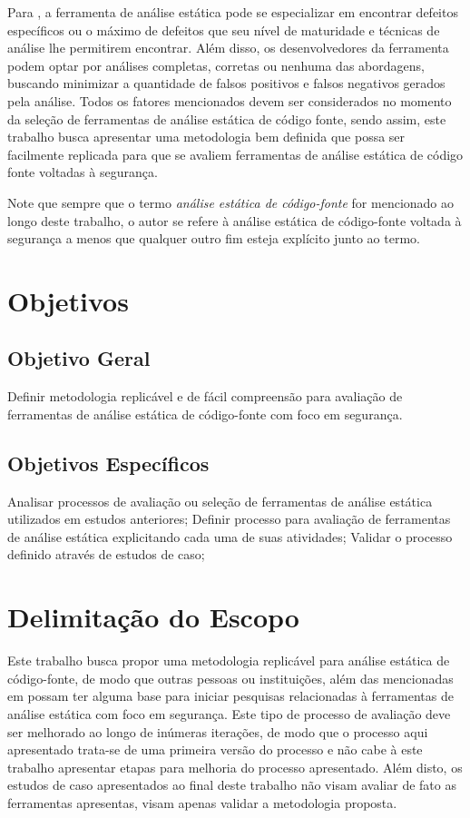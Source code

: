 Para \cite{secure_programming}, a ferramenta de análise estática pode se especializar em encontrar defeitos específicos ou o máximo de defeitos que seu nível de maturidade e técnicas de análise lhe permitirem encontrar. Além disso, os desenvolvedores da ferramenta podem optar por análises completas, corretas ou nenhuma das abordagens, buscando minimizar a quantidade de falsos positivos e falsos negativos gerados pela análise. Todos os fatores mencionados devem ser considerados no momento da seleção de ferramentas de análise estática de código fonte, sendo assim, este trabalho busca apresentar uma metodologia bem definida que possa ser facilmente replicada para que se avaliem ferramentas de análise estática de código fonte voltadas à segurança.

Note que sempre que o termo \textit{análise estática de código-fonte} for mencionado ao longo deste trabalho, o autor se refere à análise estática de código-fonte voltada à segurança a menos que qualquer outro fim esteja explícito junto ao termo.

\section{Objetivos}
\subsection{Objetivo Geral}

Definir metodologia replicável e de fácil compreensão para avaliação de ferramentas de análise estática de código-fonte com foco em segurança.

\subsection{Objetivos Específicos}

Analisar processos de avaliação ou seleção de ferramentas de análise estática utilizados em estudos anteriores;
Definir processo para avaliação de ferramentas de análise estática explicitando cada uma de suas atividades;
Validar o processo definido através de estudos de caso;

\section{Delimitação do Escopo}

Este trabalho busca propor uma metodologia replicável para análise estática de código-fonte, de modo que outras pessoas ou instituições, além das mencionadas em  possam ter alguma base para iniciar pesquisas relacionadas à ferramentas de análise estática com foco em segurança. Este tipo de processo de avaliação deve ser melhorado ao longo de inúmeras iterações, de modo que o processo aqui apresentado trata-se de uma primeira versão do processo e não cabe à este trabalho apresentar etapas para melhoria do processo apresentado. Além disto, os estudos de caso apresentados ao final deste trabalho não visam avaliar de fato as ferramentas apresentas, visam apenas validar a metodologia proposta.

